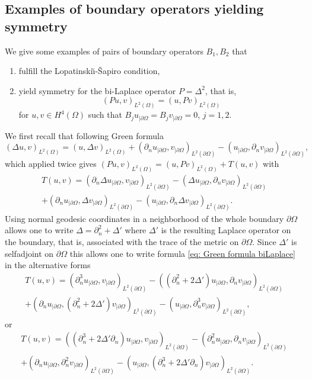 \documentclass[10pt]{amsart}
\theoremstyle{plain}
\theoremstyle{definition}
\newcommand{\LS}{Lopatinski\u{\i}-\v{S}apiro\xspace}
\newcommand{\nhd}{neighborhood\xspace}
\newcommand{\inp}[2]{(#1, #2)}
\newcommand{\bd}{\ensuremath{_{|\partial\Omega}}}
\begin{document}
\subsection{Examples of boundary operators yielding symmetry}
\label{sec: Examples of boundary operators yielding symmetry}

We give some examples of pairs of boundary operators $B_1, B_2$ that
\begin{enumerate}
\item
fulfill the
\LS condition,
\item yield symmetry for the bi-Laplace operator $P = \Delta^2$, that is,
\begin{equation*}
\inp{P u }{v}_{L^2(\Omega)} = \inp{u }{P v}_{L^2(\Omega)}
\end{equation*}
for $u,v\in H^4(\Omega)$ such that $B_j u_{|\partial\Omega} = B_j
v_{|\partial\Omega} =0$, $j=1,2$.
\end{enumerate}

We first recall that following Green formula
\begin{equation}
\label{eq: Green formula}
\inp{\Delta u }{v}_{L^2(\Omega)}
= \inp{u }{\Delta v}_{L^2(\Omega)}
+ \inp{\partial_{n} u\bd}{v\bd}_{L^2(\partial\Omega)}
- \inp{u\bd}{\partial_{n} v\bd}_{L^2(\partial\Omega)},
\end{equation}
which applied twice gives
$\inp{P u }{v}_{L^2(\Omega)}
= \inp{u }{P v}_{L^2(\Omega)} + T(u,v)$
with
\begin{multline}
\label{eq: Green formula biLaplace}
T(u,v) = \inp{\partial_{n} \Delta u\bd}{v\bd}_{L^2(\partial\Omega)}
- \inp{\Delta u\bd}{\partial_{n} v\bd}_{L^2(\partial\Omega)}\\
+ \inp{\partial_{n} u\bd}{\Delta v\bd}_{L^2(\partial\Omega)}
- \inp{u\bd}{\partial_{n} \Delta v\bd}_{L^2(\partial\Omega)}.
\end{multline}
Using normal geodesic coordinates in a \nhd of the whole boundary
$\partial\Omega$ allows one to write $\Delta = \partial_n^2 + \Delta'$
where $\Delta'$ is the resulting Laplace operator on the boundary,
that is, associated with the trace of the metric on
$\partial\Omega$. Since $\Delta'$ is selfadjoint on $\partial\Omega$
this allows one to write formula \eqref{eq: Green formula biLaplace}
in the alternative forms
\begin{multline}
\label{eq: Green formula biLaplace-bis}
T(u,v) = \inp{\partial_{n}^3 u\bd}{v\bd}_{L^2(\partial\Omega)}
- \inp{(\partial_{n}^2 + 2 \Delta') u\bd}{\partial_{n}v\bd}_{L^2(\partial\Omega)}
\\
+ \inp{\partial_{n} u\bd}{ (\partial_{n}^2 + 2 \Delta')v\bd}_{L^2(\partial\Omega)}
- \inp{u\bd}{\partial_{n}^3 v\bd}_{L^2(\partial\Omega)},
\end{multline}
or
\begin{multline}
\label{eq: Green formula biLaplace-ter}
T(u,v) =
\inp{(\partial_{n}^3
+ 2 \Delta'\partial_{n}) u\bd}{v\bd}_{L^2(\partial\Omega)}
- \inp{\partial_{n}^2 u\bd}{\partial_{n}v\bd}_{L^2(\partial\Omega)}
\\
+ \inp{\partial_{n} u\bd}{ \partial_{n}^2 v\bd}_{L^2(\partial\Omega)}
- \inp{u\bd}{(\partial_{n}^3
+ 2 \Delta'\partial_{n}) v\bd}_{L^2(\partial\Omega)}.
\end{multline}
\end{document}
